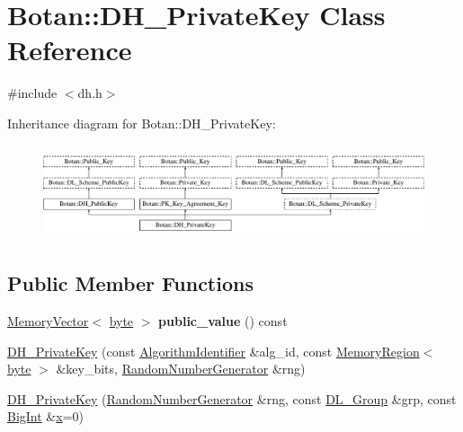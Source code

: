 \hypertarget{classBotan_1_1DH__PrivateKey}{\section{Botan\-:\-:D\-H\-\_\-\-Private\-Key Class Reference}
\label{classBotan_1_1DH__PrivateKey}
}


{\ttfamily \#include $<$dh.\-h$>$}

Inheritance diagram for Botan\-:\-:D\-H\-\_\-\-Private\-Key\-:\begin{figure}[H]
\begin{center}
\leavevmode
\includegraphics[height=2.800000cm]{classBotan_1_1DH__PrivateKey}
\end{center}
\end{figure}
\subsection*{Public Member Functions}
\begin{DoxyCompactItemize}
\item 
\hypertarget{classBotan_1_1DH__PrivateKey_adb085a526e85844065949d18e02911a0}{\hyperlink{classBotan_1_1MemoryVector}{Memory\-Vector}$<$ \hyperlink{namespaceBotan_a7d793989d801281df48c6b19616b8b84}{byte} $>$ {\bfseries public\-\_\-value} () const }\label{classBotan_1_1DH__PrivateKey_adb085a526e85844065949d18e02911a0}

\item 
\hyperlink{classBotan_1_1DH__PrivateKey_a0de7fe4b30896c0538cb6e3e399dbb61}{D\-H\-\_\-\-Private\-Key} (const \hyperlink{classBotan_1_1AlgorithmIdentifier}{Algorithm\-Identifier} \&alg\-\_\-id, const \hyperlink{classBotan_1_1MemoryRegion}{Memory\-Region}$<$ \hyperlink{namespaceBotan_a7d793989d801281df48c6b19616b8b84}{byte} $>$ \&key\-\_\-bits, \hyperlink{classBotan_1_1RandomNumberGenerator}{Random\-Number\-Generator} \&rng)
\item 
\hyperlink{classBotan_1_1DH__PrivateKey_a7bf8d729ba86b84fc06958e2b6ef233e}{D\-H\-\_\-\-Private\-Key} (\hyperlink{classBotan_1_1RandomNumberGenerator}{Random\-Number\-Generator} \&rng, const \hyperlink{classBotan_1_1DL__Group}{D\-L\-\_\-\-Group} \&grp, const \hyperlink{classBotan_1_1BigInt}{Big\-Int} \&\hyperlink{classBotan_1_1DL__Scheme__PrivateKey_a74f05875ab03ef8b35468d117e6a65e9}{x}=0)
\end{DoxyCompactItemize}
